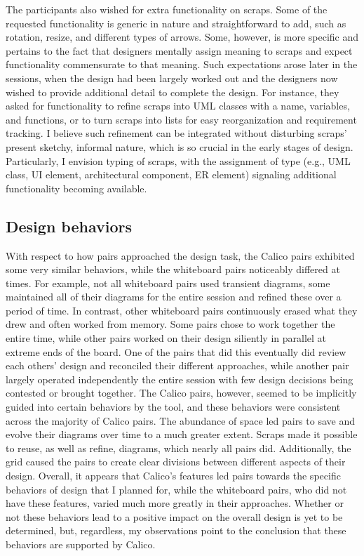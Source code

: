 The participants also wished for extra functionality on scraps. Some of the requested functionality is generic in nature and straightforward to add, such as rotation, resize, and different types of arrows. Some, however, is more specific and pertains to the fact that designers mentally assign meaning to scraps and expect functionality commensurate to that meaning. Such expectations arose later in the sessions, when the design had been largely worked out and the designers now wished to provide additional detail to complete the design. For instance, they asked for functionality to refine scraps into UML classes with a name, variables, and functions, or to turn scraps into lists for easy reorganization and requirement tracking. I believe such refinement can be integrated without disturbing scraps' present sketchy, informal nature, which is so crucial in the early stages of design. Particularly, I envision typing of scraps, with the assignment of type (e.g., UML class, UI element, architectural component, ER element) signaling additional functionality becoming available. 

\subsection {Design behaviors}
\label{discussion:2}

With respect to how pairs approached the design task, the Calico pairs exhibited some very similar behaviors, while the whiteboard pairs noticeably differed at times. For example, not all whiteboard pairs used transient diagrams, some maintained all of their diagrams for the entire session and refined these over a period of time. In contrast, other whiteboard pairs continuously erased what they drew and often worked from memory. Some pairs chose to work together the entire time, while other pairs worked on their design siliently in parallel at extreme ends of the board. One of the pairs that did this eventually did review each others' design and reconciled their different approaches, while another pair largely operated independently the entire session with few design decisions being contested or brought together. The Calico pairs, however, seemed to be implicitly guided into certain behaviors by the tool, and these behaviors were consistent across the majority of Calico pairs. The abundance of space led pairs to save and evolve their diagrams over time to a much greater extent. Scraps made it possible to reuse, as well as refine, diagrams, which nearly all pairs did. Additionally, the grid caused the pairs to create clear divisions between different aspects of their design. Overall, it appears that Calico's features led pairs towards the specific behaviors of design that I planned for, while the whiteboard pairs, who did not have these features, varied much more greatly in their approaches. Whether or not these behaviors lead to a positive impact on the overall design is yet to be determined, but, regardless, my observations point to the conclusion that these behaviors are supported by Calico.

